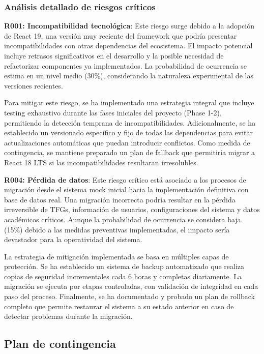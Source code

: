 \documentclass[12pt,a4paper,oneside]{report}
\begin{document}
\subsubsection{Análisis detallado de riesgos
críticos}\label{anuxe1lisis-detallado-de-riesgos-cruxedticos}

\textbf{R001: Incompatibilidad tecnológica}: Este riesgo surge debido a la adopción de React 19, una versión muy reciente del framework que podría presentar incompatibilidades con otras dependencias del ecosistema. El impacto potencial incluye retrasos significativos en el desarrollo y la posible necesidad de refactorizar componentes ya implementados. La probabilidad de ocurrencia se estima en un nivel medio (30\%), considerando la naturaleza experimental de las versiones recientes.

Para mitigar este riesgo, se ha implementado una estrategia integral que incluye testing exhaustivo durante las fases iniciales del proyecto (Phase 1-2), permitiendo la detección temprana de incompatibilidades. Adicionalmente, se ha establecido un versionado específico y fijo de todas las dependencias para evitar actualizaciones automáticas que puedan introducir conflictos. Como medida de contingencia, se mantiene preparado un plan de fallback que permitiría migrar a React 18 LTS si las incompatibilidades resultaran irresolubles.

\textbf{R004: Pérdida de datos}: Este riesgo crítico está asociado a los procesos de migración desde el sistema mock inicial hacia la implementación definitiva con base de datos real. Una migración incorrecta podría resultar en la pérdida irreversible de TFGs, información de usuarios, configuraciones del sistema y datos académicos críticos. Aunque la probabilidad de ocurrencia se considera baja (15\%) debido a las medidas preventivas implementadas, el impacto sería devastador para la operatividad del sistema.

La estrategia de mitigación implementada se basa en múltiples capas de protección. Se ha establecido un sistema de backup automatizado que realiza copias de seguridad incrementales cada 6 horas y completas diariamente. La migración se ejecuta por etapas controladas, con validación de integridad en cada paso del proceso. Finalmente, se ha documentado y probado un plan de rollback completo que permite restaurar el sistema a su estado anterior en caso de detectar problemas durante la migración.

\subsection{Plan de contingencia}\label{plan-de-contingencia}
\end{document}
